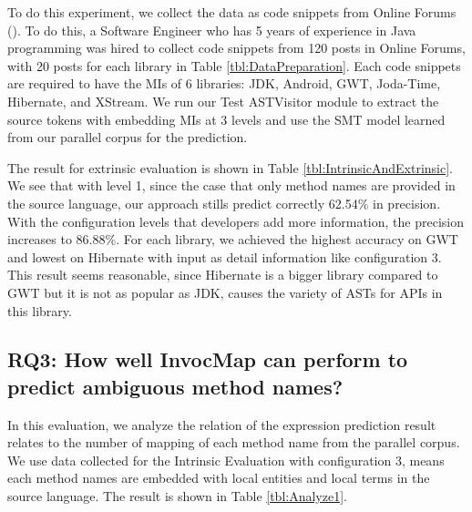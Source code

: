 To do this experiment, we collect the data as code snippets from Online Forums (\cite{id:StackOverflow,id:ProgramCreek,id:GeeksForGeeks}). To do this, a Software Engineer who has 5 years of experience in Java programming was hired to collect code snippets from 120 posts in Online Forums, with 20 posts for each library in Table \ref{tbl:DataPreparation}. Each code snippets are required to have the MIs of 6 libraries: JDK, Android, GWT, Joda-Time, Hibernate, and XStream. We run our Test ASTVisitor module to extract the source tokens with embedding MIs at 3 levels and use the SMT model learned from our parallel corpus for the prediction.

The result for extrinsic evaluation is shown in Table \ref{tbl:IntrinsicAndExtrinsic}. We see that with level 1, since the case that only method names are provided in the source language, our approach stills predict correctly 62.54\% in precision. With the configuration levels that developers add more information, the precision increases to 86.88\%. For each library, we achieved the highest accuracy on GWT and lowest on Hibernate with input as detail information like configuration 3. This result seems reasonable, since Hibernate is a bigger library compared to GWT but it is not as popular as JDK, causes the variety of ASTs for APIs in this library.




\subsection{RQ3: How well InvocMap can perform to predict ambiguous method names?}

In this evaluation, we analyze the relation of the expression prediction result relates to the number of mapping of each method name from the parallel corpus. We use data collected for the Intrinsic Evaluation with configuration 3, means each method names are embedded with local entities and local terms in the source language. The result is shown in Table \ref{tbl:Analyze1}.

